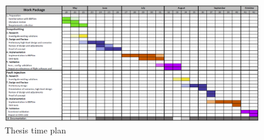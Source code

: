 \documentclass[12pt,english]{rftthesis}
\begin{document}
\begin{figure}[H]
	\includegraphics[scale=0.3]{art/time_plan.png}
	\caption{Thesis time plan}
\end{figure}
\end{document}
